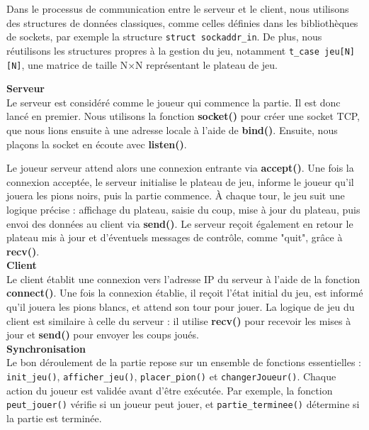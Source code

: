 \documentclass[12pt, a4paper, oneside]{article}
\begin{document}
            Dans le processus de communication entre le serveur et le client, nous utilisons des structures de données classiques, comme celles définies dans les bibliothèques de sockets, par exemple la structure \texttt{struct sockaddr\_in}. De plus, nous réutilisons les structures propres à la gestion du jeu, notamment \texttt{t\_case jeu[N][N]}, une matrice de taille N×N représentant le plateau de jeu.
            
            
            \textbf{Serveur} \\
        
            Le serveur est considéré comme le joueur qui commence la partie. Il est donc lancé en premier. Nous utilisons la fonction \textbf{socket()} pour créer une socket TCP, que nous lions ensuite à une adresse locale à l’aide de \textbf{bind()}. Ensuite, nous plaçons la socket en écoute avec \textbf{listen()}.
            
            Le joueur serveur attend alors une connexion entrante via \textbf{accept()}. Une fois la connexion acceptée, le serveur initialise le plateau de jeu, informe le joueur qu’il jouera les pions noirs, puis la partie commence. À chaque tour, le jeu suit une logique précise : affichage du plateau, saisie du coup, mise à jour du plateau, puis envoi des données au client via \textbf{send()}. Le serveur reçoit également en retour le plateau mis à jour et d’éventuels messages de contrôle, comme "quit", grâce à \textbf{recv()}. \\
        

            \textbf{Client} \\
            
            Le client établit une connexion vers l’adresse IP du serveur à l’aide de la fonction \textbf{connect()}. Une fois la connexion établie, il reçoit l’état initial du jeu, est informé qu’il jouera les pions blancs, et attend son tour pour jouer. La logique de jeu du client est similaire à celle du serveur : il utilise \textbf{recv()} pour recevoir les mises à jour et \textbf{send()} pour envoyer les coups joués. \\
        

            \textbf{Synchronisation} \\

            Le bon déroulement de la partie repose sur un ensemble de fonctions essentielles : \texttt{init\_jeu()}, \texttt{afficher\_jeu()}, \texttt{placer\_pion()} et \texttt{changerJoueur()}. Chaque action du joueur est validée avant d’être exécutée. Par exemple, la fonction \texttt{peut\_jouer()} vérifie si un joueur peut jouer, et \texttt{partie\_terminee()} détermine si la partie est terminée.
        
\end{document}
